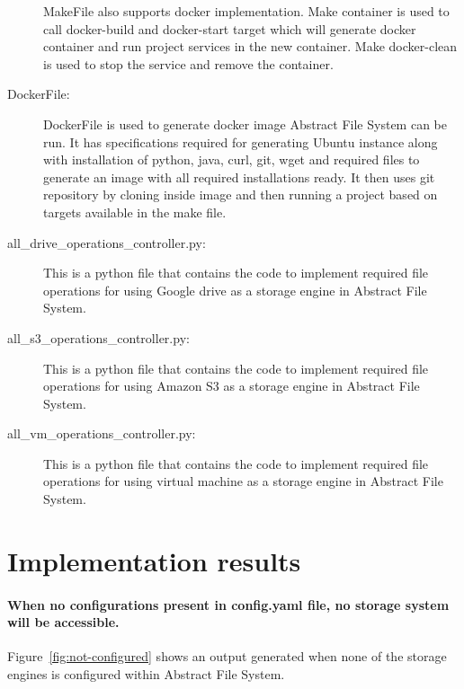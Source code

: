 \begin{description}
MakeFile also supports docker implementation. Make container is used to call 
docker-build and docker-start target which will generate docker container and 
run project services in the new container. Make docker-clean is used to stop 
the service and remove the container. 

\item[DockerFile:]


DockerFile is used to generate docker image Abstract File System can be run. 
It has specifications required for generating Ubuntu instance along with 
installation of python, java, curl, git, wget and required files to generate 
an image with all required installations ready. It then uses git repository by 
cloning inside image and then running a project based on targets available in 
the make file. 

\item[all\_drive\_operations\_controller.py:]


This is a python file that contains the code to implement required file 
operations for using Google drive as a storage engine in Abstract File System.

\item[all\_s3\_operations\_controller.py:]


This is a python file that contains the code to implement required file 
operations for using Amazon S3 as a storage engine in Abstract File System. 

\item[all\_vm\_operations\_controller.py:]

This is a python file that contains the code to implement required file 
operations for using virtual machine as a storage engine in Abstract File 
System. 

\end{description}



\section{Implementation results}

\paragraph{When no configurations present in config.yaml file, no storage 
system will be accessible.}


Figure~\ref{fig:not-configured} shows an output generated when none of 
the storage engines is configured within Abstract File System. 


